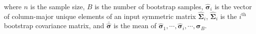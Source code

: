 \noindent where
$n$ is the sample size,
$B$ is the number of bootstrap samples,
$\hat{\boldsymbol{\sigma}}_i$
is the vector of column-major unique elements of an input symmetric matrix
$\hat{\boldsymbol{\Sigma}}_i$,
$\hat{\boldsymbol{\Sigma}}_i$
is the $i^{\mathrm{th}}$ bootstrap covariance matrix,
and
$\bar{\hat{\boldsymbol{\sigma}}}$
is the mean of
$
\hat{\boldsymbol{\sigma}}_1,
\cdots,
\hat{\boldsymbol{\sigma}}_i,
\cdots,
\hat{\boldsymbol{\sigma}}_B
$.


